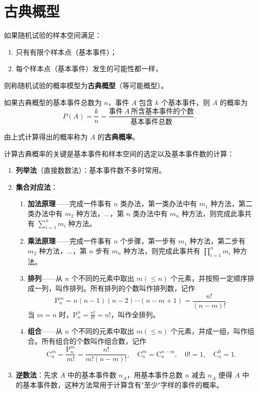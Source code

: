 \documentclass[lang=cn,11pt]{elegantbook}
\begin{document}
\section{古典概型}

\begin{definition}[古典概型] \label{def:classical-prob}
如果随机试验的样本空间满足：
\begin{enumerate}
    \item 只有有限个样本点（基本事件）；
    \item 每个样本点（基本事件）发生的可能性都一样，
\end{enumerate}
则称随机试验的概率模型为\textbf{古典概型}（等可能概型）。
\end{definition}

如果古典概型的基本事件总数为 \(n\)，事件 \(A\) 包含 \(k\) 个基本事件，则 \(A\) 的概率为
\[
P(A) = \frac{k}{n} = \frac{\text{事件} \ A \ \text{所含基本事件的个数}}{\text{基本事件总数}}.
\]

由上式计算得出的概率称为 \(A\) 的\textbf{古典概率}。

\begin{note}
计算古典概率的关键是基本事件和样本空间的选定以及基本事件数的计算：
\begin{enumerate}
    \item \textbf{列举法}（直接数数法）：基本事件数不多时常用。
    \item \textbf{集合对应法}：
    \begin{enumerate}
        \item \textbf{加法原理}——完成一件事有 \(n\) 类办法，第一类办法中有 \(m_1\) 种方法，第二类办法中有 \(m_2\) 种方法，\(\dots\)，第 \(n\) 类办法中有 \(m_n\) 种方法，则完成此事共有 \(\sum_{i=1}^{n} m_i\) 种方法。
        \item \textbf{乘法原理}——完成一件事有 \(n\) 个步骤，第一步有 \(m_1\) 种方法，第二步有 \(m_2\) 种方法，\(\dots\)，第 \(n\) 步有 \(m_n\) 种方法，则完成此事共有 \(\prod_{i=1}^{n} m_i\) 种方法。
        \item \textbf{排列}——从 \(n\) 个不同的元素中取出 \(m(\le n)\) 个元素，并按照一定顺序排成一列，叫作排列。所有排列的个数叫作排列数，记作
        \[
        \mathrm{P}_n^m = n(n-1)(n-2)\cdots(n-m+1) = \frac{n!}{(n-m)!}.
        \]
        当 \(m=n\) 时，\(\mathrm{P}_n^n = \frac{n!}{0!} = n!\)，叫作全排列。
        \item \textbf{组合}——从 \(n\) 个不同的元素中取出 \(m(\le n)\) 个元素，并成一组，叫作组合。所有组合的个数叫作组合数，记作
        \[
        \mathrm{C}_n^m = \frac{\mathrm{P}_n^m}{m!} = \frac{n!}{m!(n-m)!}, \quad \mathrm{C}_n^m = \mathrm{C}_n^{n-m}, \quad 0!=1, \quad \mathrm{C}_n^0=1.
        \]
    \end{enumerate}
    \item \textbf{逆数法}：先求 \(\overline{A}\) 中的基本事件数 \(n_{\overline{A}}\)，用基本事件总数 \(n\) 减去 \(n_{\overline{A}}\) 便得 \(A\) 中的基本事件数，这种方法常用于计算含有"至少"字样的事件的概率。
\end{enumerate}
\end{note}
\end{document}
